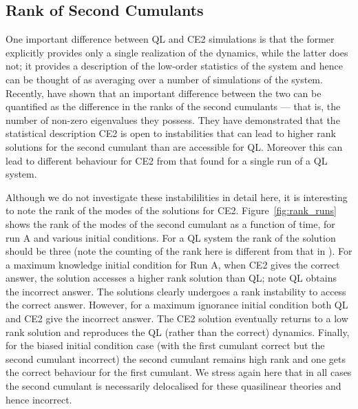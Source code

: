 \documentclass{jfm}
\newcommand{\cu}{c_u}
\begin{document}

%
\subsection{Rank of Second Cumulants}
\label{sec:rank}
One important difference between QL and CE2 simulations is that the former explicitly provides only a single realization of the dynamics, while the latter does not; it provides a description of the low-order statistics of the system and hence can be thought of as averaging over a number of simulations of the system. 
Recently, \citet{nivarti_22}  have shown that an important difference between the two can be quantified as the difference in the ranks of the second cumulants --- that is, the number of non-zero eigenvalues they possess. They have demonstrated that the statistical description CE2 is open to instabilities that can lead to higher rank solutions for the second cumulant than are accessible for QL. Moreover this can lead to different behaviour for CE2 from that found for a single run of a QL system.

Although we do not investigate these instabililities in detail here, it is interesting to note the rank of the modes of the solutions for CE2. Figure~\ref{fig:rank_runs} shows the rank of the modes of the second cumulant as a function of time, for run A and various initial conditions. For a QL system the rank of the solution should be three (note the counting of the rank here is different from that in \citet[][]{nivarti_22}).
For a maximum knowledge initial condition for Run A, when CE2 gives the correct answer, the solution accesses a higher rank solution than QL; note QL obtains the incorrect answer. The solutions clearly undergoes a rank instability to access the correct answer. However, for a maximum ignorance initial condition both QL and CE2 give the incorrect answer. The CE2 solution eventually returns to a low rank solution and reproduces the QL (rather than the correct) dynamics. Finally, for the 
biased initial condition case (with the first cumulant correct but the second cumulant incorrect) the second cumulant remains high rank and one gets the correct behaviour for the first cumulant. We stress again here that in all cases the second cumulant is necessarily delocalised for these quasilinear theories and hence incorrect.
\end{document}
